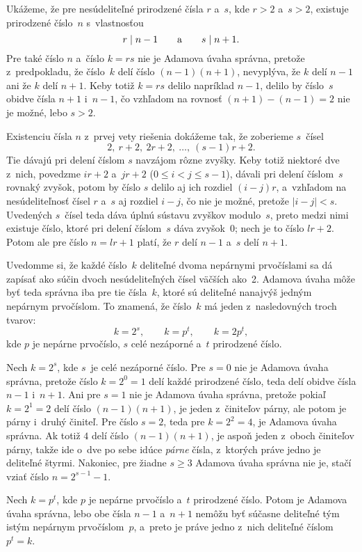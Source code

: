 {%
Ukážeme, že pre nesúdeliteľné prirodzené čísla $r$ a~$s$, kde $r>2$ a~$s>2$,
existuje prirodzené číslo~$n$ s~vlastnosťou
$$
r\mid n-1\qquad\hbox{a}\qquad s\mid n+1.
$$
Pre také číslo $n$ a~číslo $k=rs$ nie je Adamova úvaha
správna, pretože z~predpokladu, že číslo~$k$ delí číslo $(n-1)(n+1)$, nevyplýva, že
$k$ delí $n-1$ ani že $k$ delí $n+1$. Keby totiž $k=rs$ delilo napríklad $n-1$,
delilo by číslo~$s$ obidve čísla $n+1$ i~$n-1$, čo vzhľadom na rovnosť $(n+1)-(n-1)=2$
nie je možné, lebo $s>2$.

Existenciu čísla $n$ z~prvej vety riešenia dokážeme tak, že zoberieme $s$~čísel
$$
2,\ r+2,\ 2r+2,\ \dots,\ (s-1)r+2.
$$
Tie dávajú pri delení číslom $s$ navzájom rôzne zvyšky. Keby totiž
niektoré dve z~nich, povedzme $ir+2$ a~$jr+2$ ($0\le i<j\le s-1$),
dávali pri delení číslom~$s$ rovnaký zvyšok, potom by číslo $s$ delilo
aj ich rozdiel $(i-j)r$, a~vzhľadom na nesúdeliteľnosť čísel $r$ a~$s$
aj rozdiel $i-j$, čo nie je možné, pretože $|i-j|<s$. Uvedených $s$~čísel teda
dáva úplnú sústavu zvyškov modulo~$s$, preto medzi nimi existuje
číslo, ktoré pri delení číslom~$s$ dáva zvyšok~0; nech je to číslo $lr+2$.
Potom ale pre číslo $n=lr+1$ platí, že $r$ delí $n-1$ a~$s$ delí $n+1$.


Uvedomme si, že každé
číslo~$k$ deliteľné dvoma nepárnymi prvočíslami sa dá zapísať ako súčin
dvoch nesúdeliteľných čísel väčších ako~2. Adamova úvaha môže byť teda správna iba
pre tie čísla~$k$, ktoré sú deliteľné nanajvýš jedným nepárnym prvočíslom.
To znamená, že číslo~$k$ má jeden z~nasledovných troch tvarov:
$$
k=2^s,\qquad k=p^t,\qquad k=2p^t,
$$
kde $p$ je nepárne prvočíslo, $s$ celé nezáporné a~$t$ prirodzené číslo.


Nech $k=2^s$, kde $s$~je celé nezáporné číslo. Pre $s=0$ nie je Adamova úvaha
správna, pretože číslo $k=2^0=1$ delí každé prirodzené číslo, teda delí obidve
čísla $n-1$ i~$n+1$. Ani pre $s=1$ nie je Adamova úvaha správna, pretože
pokiaľ $k=2^1=2$ delí číslo $(n-1)(n+1)$, je jeden z~činiteľov párny, ale
potom je párny i~druhý činiteľ. Pre číslo $s=2$, teda pre
$k=2^2=4$, je Adamova úvaha správna. Ak totiž $4$ delí číslo $(n-1)(n+1)$,
je aspoň jeden z~oboch činiteľov párny, takže ide o~dve po sebe idúce {\it párne\/}
čísla, z~ktorých práve jedno je deliteľné štyrmi.
Nakoniec, pre žiadne $s\ge3$ Adamova úvaha správna nie je, stačí vziať
číslo $n=2^{s-1}-1$.

Nech $k=p^t$, kde $p$ je nepárne prvočíslo a~$t$ prirodzené číslo. Potom je
Adamova úvaha správna, lebo obe čísla $n-1$ a~$n+1$ nemôžu byť súčasne
deliteľné tým istým nepárnym prvočíslom~$p$, a~preto je práve jedno z~nich deliteľné
číslom $p^t=k$.

}
